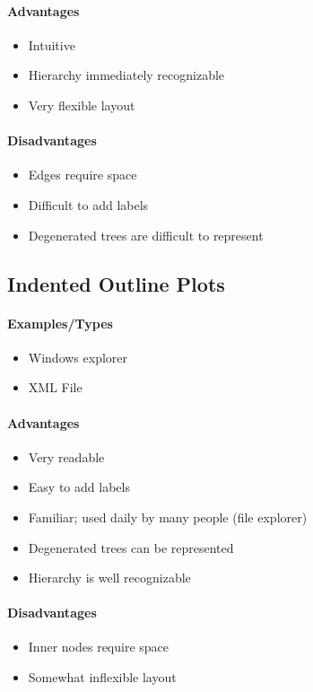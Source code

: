 \documentclass[10pt,a4paper]{article}
\begin{document}
		\paragraph{Advantages}
		\begin{itemize}
			\item Intuitive
			\item Hierarchy immediately recognizable
			\item Very flexible layout
		\end{itemize}
		\paragraph{Disadvantages}
		\begin{itemize}
			\item Edges require space
			\item Difficult to add labels
			\item Degenerated trees are difficult to represent
		\end{itemize}
	
	\subsection{Indented Outline Plots}
		\paragraph{Examples/Types}
		\begin{itemize}
			\item Windows explorer
			\item XML File 
		\end{itemize}
		\paragraph{Advantages}
		\begin{itemize}
			\item Very readable
			\item Easy to add labels
			\item Familiar; used daily by many people (file explorer)
			\item Degenerated trees can be represented
			\item Hierarchy is well recognizable
		\end{itemize}
		\paragraph{Disadvantages}
		\begin{itemize}
			\item Inner nodes require space
			\item Somewhat inflexible layout
		\end{itemize}
	
\end{document}
